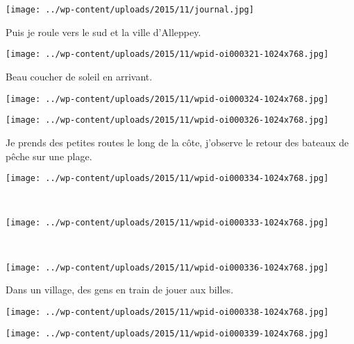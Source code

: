 ~\\~\\
\begin{center} \texttt{[image: ../wp-content/uploads/2015/11/journal.jpg]} \end{center}

 Puis je roule vers le sud et la ville d'Alleppey. 
\begin{center} \texttt{[image: ../wp-content/uploads/2015/11/wpid-oi000321-1024x768.jpg]} \end{center}
\vspace{-\topsep}
\pagebreak
 
 Beau coucher de soleil en arrivant. 
\begin{center} \texttt{[image: ../wp-content/uploads/2015/11/wpid-oi000324-1024x768.jpg]} \end{center}
\begin{center} \texttt{[image: ../wp-content/uploads/2015/11/wpid-oi000326-1024x768.jpg]} \end{center}
\vspace{-\topsep}
\vspace{-3.25mm}
\pagebreak
 
   Je prends des petites routes le long de la côte, j'observe le retour des bateaux de pêche sur une plage. 
\begin{center} \texttt{[image: ../wp-content/uploads/2015/11/wpid-oi000334-1024x768.jpg]} \end{center}
~
\begin{center} \texttt{[image: ../wp-content/uploads/2015/11/wpid-oi000333-1024x768.jpg]} \end{center}
\vspace{-\topsep}
\pagebreak
~\\
\vspace{0.75mm}
\begin{center} \texttt{[image: ../wp-content/uploads/2015/11/wpid-oi000336-1024x768.jpg]} \end{center}

 Dans un village, des gens en train de jouer aux billes. 
\begin{center} \texttt{[image: ../wp-content/uploads/2015/11/wpid-oi000338-1024x768.jpg]} \end{center}
\begin{center} \texttt{[image: ../wp-content/uploads/2015/11/wpid-oi000339-1024x768.jpg]} \end{center}

